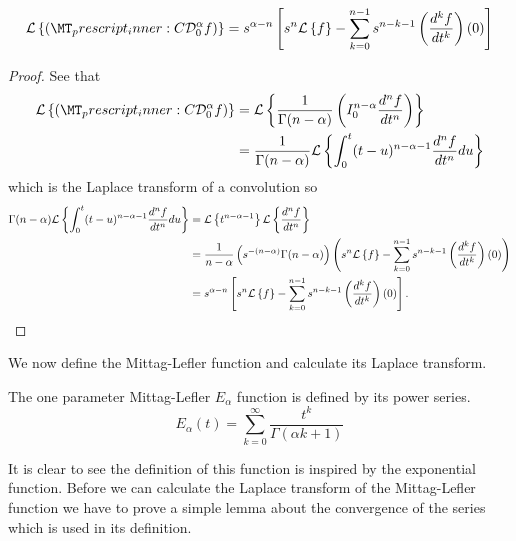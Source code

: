 \documentclass{article}
\begin{document}
\begin{lemma}
	\begin{align*}
		\laplace{\capder{0}{\alpha}{f}} = s^{\alpha - n} \left[ s^n \laplace{f} - \sum_{k=0}^{n-1} s^{n-k-1} \left( \der{f}{t}{k} \right)(0) \right]
	\end{align*}
\end{lemma}
\begin{proof}
	See that
	\begin{align*}
		\laplace{\capder{0}{\alpha}{f}} &= \laplace{ \frac{1}{\Gamma(n-\alpha)} \rli{0}{n-\alpha}{\der{f}{t}{n}}} \\
			&= \frac{1}{\Gamma(n-\alpha)}\laplace{ \int_0^t (t-u)^{n-\alpha-1} \der{f}{t}{n} du} \\ 
	\end{align*}
	which is the Laplace transform of a convolution so
	\begin{align*}
		\Gamma(n-\alpha)\mathcal{L} \left\{  \int_0^t (t-u)^{n-\alpha-1} \frac{d^{n}f}{dt^{n}} du \right\} &= \mathcal{L} \left\{ t^{n-\alpha-1} \right\} \mathcal{L} \left\{ \frac{d^{n}f}{dt^{n}} \right\} \\
		&= \frac{1}{n-\alpha} \left( s^{-(n-\alpha)} \Gamma(n-\alpha) \right) \left( s^n \mathcal{L} \left\{ f \right\} - \sum_{k=0}^{n-1} s^{n-k-1} \left( \frac{d^{k}f}{dt^{k}} \right)(0) \right) \\
		&= s^{\alpha - n} \left[ s^n \mathcal{L} \left\{ f \right\} - \sum_{k=0}^{n-1} s^{n-k-1} \left( \frac{d^{k}f}{dt^{k}} \right)(0) \right].
	\end{align*}	
\end{proof}

We now define the Mittag-Lefler function and calculate its Laplace transform.

\begin{definition}
	The one parameter Mittag-Lefler $ E_\alpha $ function is defined by its power series.
	$$
		E_\alpha(t) = \sum_{k=0}^{\infty} \frac{t^k}{\Gamma(\alpha k + 1)}
	$$
\end{definition}
It is clear to see the definition of this function is inspired by the exponential function. Before we can calculate the 
Laplace transform of the Mittag-Lefler function we have to prove a simple lemma about the convergence of the 
series which is used in its definition.
\end{document}
